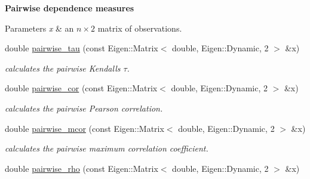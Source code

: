 \begin{Indent}{\bf Pairwise dependence measures}\par
{\em 
\begin{DoxyParams}{Parameters}
{\em x} & an $ n \times 2 $ matrix of observations. \\
\hline
\end{DoxyParams}
}\begin{DoxyCompactItemize}
\item 
double \hyperlink{namespacevinecopulib_1_1tools__stats_a8530da1bb8eb0f8a25eb86b6574bed02}{pairwise\+\_\+tau} (const Eigen\+::\+Matrix$<$ double, Eigen\+::\+Dynamic, 2 $>$ \&x)\hypertarget{namespacevinecopulib_1_1tools__stats_a8530da1bb8eb0f8a25eb86b6574bed02}{}\label{namespacevinecopulib_1_1tools__stats_a8530da1bb8eb0f8a25eb86b6574bed02}

\begin{DoxyCompactList}\small\item\em calculates the pairwise Kendall\textquotesingle{}s $ \tau $. \end{DoxyCompactList}\item 
double \hyperlink{namespacevinecopulib_1_1tools__stats_ad076513f9a531a015bb0eaff098a8271}{pairwise\+\_\+cor} (const Eigen\+::\+Matrix$<$ double, Eigen\+::\+Dynamic, 2 $>$ \&x)\hypertarget{namespacevinecopulib_1_1tools__stats_ad076513f9a531a015bb0eaff098a8271}{}\label{namespacevinecopulib_1_1tools__stats_ad076513f9a531a015bb0eaff098a8271}

\begin{DoxyCompactList}\small\item\em calculates the pairwise Pearson correlation. \end{DoxyCompactList}\item 
double \hyperlink{namespacevinecopulib_1_1tools__stats_a1b9d36a9b5611c2802fa4a169a760a1d}{pairwise\+\_\+mcor} (const Eigen\+::\+Matrix$<$ double, Eigen\+::\+Dynamic, 2 $>$ \&x)\hypertarget{namespacevinecopulib_1_1tools__stats_a1b9d36a9b5611c2802fa4a169a760a1d}{}\label{namespacevinecopulib_1_1tools__stats_a1b9d36a9b5611c2802fa4a169a760a1d}

\begin{DoxyCompactList}\small\item\em calculates the pairwise maximum correlation coefficient. \end{DoxyCompactList}\item 
double \hyperlink{namespacevinecopulib_1_1tools__stats_aa5cb9d201eef90b94024e5d354ac8174}{pairwise\+\_\+rho} (const Eigen\+::\+Matrix$<$ double, Eigen\+::\+Dynamic, 2 $>$ \&x)\hypertarget{namespacevinecopulib_1_1tools__stats_aa5cb9d201eef90b94024e5d354ac8174}{}\label{namespacevinecopulib_1_1tools__stats_aa5cb9d201eef90b94024e5d354ac8174}


\end{DoxyCompactItemize}
\end{Indent}
